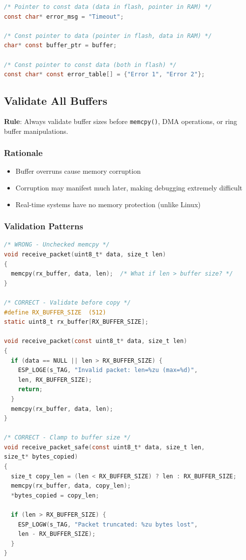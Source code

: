 \begin{lstlisting}[language=C]
/* Pointer to const data (data in flash, pointer in RAM) */
const char* error_msg = "Timeout";

/* Const pointer to data (pointer in flash, data in RAM) */
char* const buffer_ptr = buffer;

/* Const pointer to const data (both in flash) */
const char* const error_table[] = {"Error 1", "Error 2"};


\end{lstlisting}
\subsection{Validate All Buffers}

\textbf{Rule}: Always validate buffer sizes before \texttt{memcpy()}, DMA operations, or ring buffer manipulations.

\subsubsection{Rationale}

\begin{itemize}
\item Buffer overruns cause memory corruption
\item Corruption may manifest much later, making debugging extremely difficult
\item Real-time systems have no memory protection (unlike Linux)
\end{itemize}

\subsubsection{Validation Patterns}

\begin{lstlisting}[language=C]
/* WRONG - Unchecked memcpy */
void receive_packet(uint8_t* data, size_t len)
{
  memcpy(rx_buffer, data, len);  /* What if len > buffer size? */
}

/* CORRECT - Validate before copy */
#define RX_BUFFER_SIZE  (512)
static uint8_t rx_buffer[RX_BUFFER_SIZE];

void receive_packet(const uint8_t* data, size_t len)
{
  if (data == NULL || len > RX_BUFFER_SIZE) {
    ESP_LOGE(s_TAG, "Invalid packet: len=%zu (max=%d)",
    len, RX_BUFFER_SIZE);
    return;
  }
  memcpy(rx_buffer, data, len);
}

/* CORRECT - Clamp to buffer size */
void receive_packet_safe(const uint8_t* data, size_t len,
size_t* bytes_copied)
{
  size_t copy_len = (len < RX_BUFFER_SIZE) ? len : RX_BUFFER_SIZE;
  memcpy(rx_buffer, data, copy_len);
  *bytes_copied = copy_len;
  
  if (len > RX_BUFFER_SIZE) {
    ESP_LOGW(s_TAG, "Packet truncated: %zu bytes lost",
    len - RX_BUFFER_SIZE);
  }
}


\end{lstlisting}
